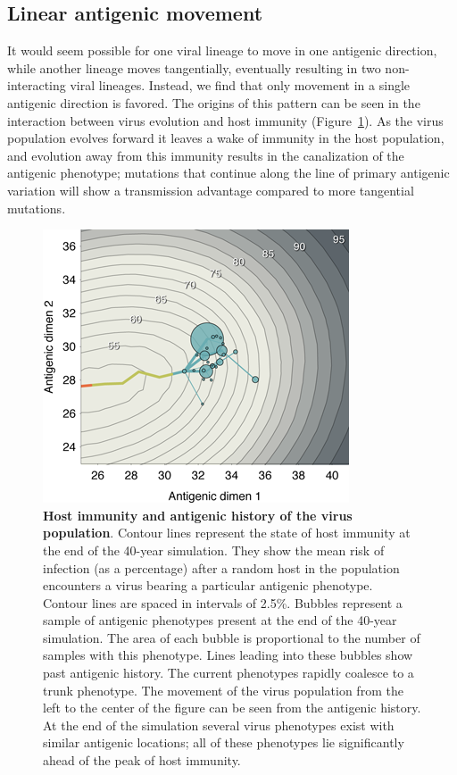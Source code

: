 \documentclass[11pt,oneside,letterpaper]{article}
\begin{document}
\subsection*{Linear antigenic movement}

It would seem possible for one viral lineage to move in one antigenic direction, while another lineage moves tangentially, eventually resulting in two non-interacting viral lineages.  Instead, we find that only movement in a single antigenic direction is favored.  The origins of this pattern can be seen in the interaction between virus evolution and host immunity (Figure~\ref{immunity}).  As the virus population evolves forward it leaves a wake of immunity in the host population, and evolution away from this immunity results in the canalization of the antigenic phenotype; mutations that continue along the line of primary antigenic variation will show a transmission advantage compared to more tangential mutations.  

\begin{figure}[tb]
	\centering
	\includegraphics{figures/immunity}
	\caption{\textbf{Host immunity and antigenic history of the virus population}.  Contour lines represent the state of host immunity at the end of the 40-year simulation.  They show the mean risk of infection (as a percentage) after a random host in the population encounters a virus bearing a particular antigenic phenotype.  Contour lines are spaced in intervals of 2.5\%. Bubbles represent a sample of antigenic phenotypes present at the end of the 40-year simulation.  The area of each bubble is proportional to the number of samples with this phenotype.  Lines leading into these bubbles show past antigenic history.  The current phenotypes rapidly coalesce to a trunk phenotype.  The movement of the virus population from the left to the center of the figure can be seen from the antigenic history.  At the end of the simulation several virus phenotypes exist with similar antigenic locations; all of these phenotypes lie significantly ahead of the peak of host immunity.}
	\label{immunity}
\end{figure}
\end{document}
